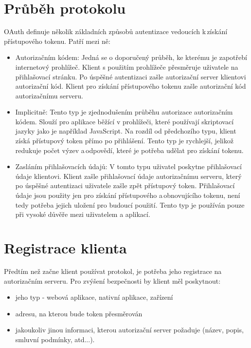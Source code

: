 \documentclass[]{fithesis3}
\begin{document}
	\section{Průběh protokolu}

	OAuth definuje několik základních způsobů autentizace vedoucích k\,získání přístupového 			tokenu. Patří mezi ně:

		\begin{itemize}
 		\item Autorizačním kódem:
  		\newline
		Jedná se o doporučený průběh, ke kterému je zapotřebí internetový prohlížeč. Klient s použitím prohlížeče přesměruje uživatele na přihlašovací stránku. Po 			úspěšné autentizaci zašle autorizační server klientovi autorizační kód. Klient pro získání 			přístupového tokenu zašle autorizační kód autorizačnímu serveru.
  		\item Implicitně:
  		\newline
		Tento typ je zjednodušením průběhu autorizace autorizačním kódem. Slouží pro aplikace 			běžící v prohlížeči, které používají skriptovací jazyky jako je například JavaScript. Na rozdíl 		od předchozího typu, klient získá přístupový token přímo po přihlášení. Tento typ je 				rychlejší,	jelikož redukuje počet výzev a\,odpovědí, které je potřeba udělat pro získání 				tokenu.
 	 	\item Zasláním přihlašovacích údajů:
  		\newline
		V tomto typu uživatel poskytne přihlašovací údaje klientovi. Klient zašle přihlašovací údaje 		autorizačnímu serveru, který po úspěšné autentizaci uživatele zašle zpět přístupový 				token. Přihlašovací údaje jsou použity jen pro získání přístupového a\,obnovujícího tokenu, 			není tedy potřeba jejich uložení pro budoucí použití. Tento typ je používán pouze při 				vysoké důvěře mezi uživatelem a aplikací. 
		\end{itemize}
		
	\newpage

	\section{Registrace klienta}

	Předtím než začne klient používat protokol, je potřeba jeho registrace na autorizačním serveru. 	Pro zvýšení bezpečnosti by klient měl poskytnout:

	\begin{itemize}
  		\item jeho typ - webová aplikace, nativní aplikace, zařízení
		\item adresu, na kterou bude token přesměrován
		\item jakoukoliv jinou informaci, kterou autorizační server požaduje (název, popis, smluvní 				podmínky, atd...).
	\end{itemize}
\end{document}
